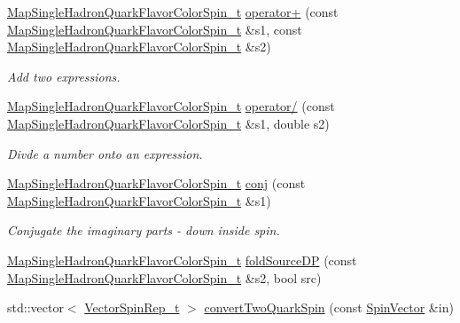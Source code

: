 \begin{DoxyCompactItemize}
\mbox{\hyperlink{namespaceHadron_a03b319764f85c20434f20a269ce5f388}{Map\+Single\+Hadron\+Quark\+Flavor\+Color\+Spin\+\_\+t}} \mbox{\hyperlink{namespaceHadron_a168571d9c710321169dad756440c1952}{operator+}} (const \mbox{\hyperlink{namespaceHadron_a03b319764f85c20434f20a269ce5f388}{Map\+Single\+Hadron\+Quark\+Flavor\+Color\+Spin\+\_\+t}} \&s1, const \mbox{\hyperlink{namespaceHadron_a03b319764f85c20434f20a269ce5f388}{Map\+Single\+Hadron\+Quark\+Flavor\+Color\+Spin\+\_\+t}} \&s2)
\begin{DoxyCompactList}\small\item\em Add two expressions. \end{DoxyCompactList}\item 
\mbox{\hyperlink{namespaceHadron_a03b319764f85c20434f20a269ce5f388}{Map\+Single\+Hadron\+Quark\+Flavor\+Color\+Spin\+\_\+t}} \mbox{\hyperlink{namespaceHadron_ae43d51b030dac0dd81991cf7c401507a}{operator/}} (const \mbox{\hyperlink{namespaceHadron_a03b319764f85c20434f20a269ce5f388}{Map\+Single\+Hadron\+Quark\+Flavor\+Color\+Spin\+\_\+t}} \&s1, double s2)
\begin{DoxyCompactList}\small\item\em Divde a number onto an expression. \end{DoxyCompactList}\item 
\mbox{\hyperlink{namespaceHadron_a03b319764f85c20434f20a269ce5f388}{Map\+Single\+Hadron\+Quark\+Flavor\+Color\+Spin\+\_\+t}} \mbox{\hyperlink{namespaceHadron_a225bbef2231c488eb28201396913bae0}{conj}} (const \mbox{\hyperlink{namespaceHadron_a03b319764f85c20434f20a269ce5f388}{Map\+Single\+Hadron\+Quark\+Flavor\+Color\+Spin\+\_\+t}} \&s1)
\begin{DoxyCompactList}\small\item\em Conjugate the imaginary parts -\/ down inside spin. \end{DoxyCompactList}\item 
\mbox{\hyperlink{namespaceHadron_a03b319764f85c20434f20a269ce5f388}{Map\+Single\+Hadron\+Quark\+Flavor\+Color\+Spin\+\_\+t}} \mbox{\hyperlink{namespaceHadron_a273b8ceda53ab61615d67cead7c42d94}{fold\+Source\+DP}} (const \mbox{\hyperlink{namespaceHadron_a03b319764f85c20434f20a269ce5f388}{Map\+Single\+Hadron\+Quark\+Flavor\+Color\+Spin\+\_\+t}} \&s2, bool src)
\item 
std\+::vector$<$ \mbox{\hyperlink{structHadron_1_1VectorSpinRep__t}{Vector\+Spin\+Rep\+\_\+t}} $>$ \mbox{\hyperlink{namespaceHadron_a87528a5f45980257a1473a3f77301a5b}{convert\+Two\+Quark\+Spin}} (const \mbox{\hyperlink{group__defs_ga4cb5c4207c68050d0bd3e3e2d614bc78}{Spin\+Vector}} \&in)

\end{DoxyCompactItemize}
